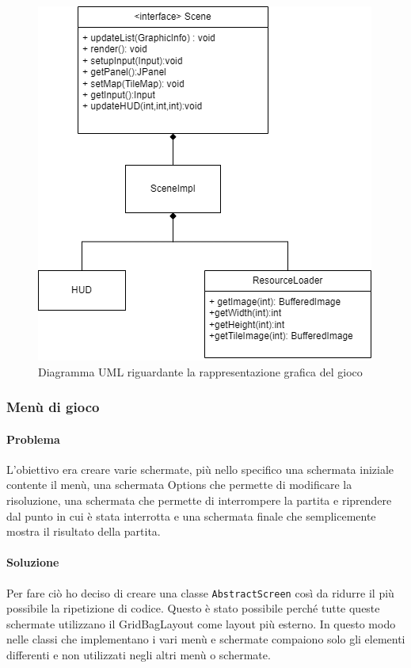 \documentclass[a4paper,12pt]{report}
\begin{document}
	\begin{figure}[h]
		\centering
		\includegraphics[width=\textwidth]{uml/uml_scene.png}
		\caption{Diagramma UML riguardante la rappresentazione grafica del gioco}
	\end{figure}

\subsubsection{Menù di gioco}
\paragraph*{Problema}
	L'obiettivo era creare varie schermate, più nello specifico una schermata iniziale contente il menù, una schermata Options che permette di modificare la risoluzione, una schermata che permette di interrompere la partita e riprendere dal punto in cui è stata interrotta e una schermata finale che semplicemente mostra il risultato della partita.
\paragraph*{Soluzione}
	Per fare ciò ho deciso di creare una classe \texttt{AbstractScreen} così da ridurre il più possibile la ripetizione di codice. Questo è stato possibile perché tutte queste schermate utilizzano il GridBagLayout come layout più esterno.
	In questo modo nelle classi che implementano i vari menù e schermate compaiono solo gli elementi differenti e non utilizzati negli altri menù o schermate.
\end{document}
